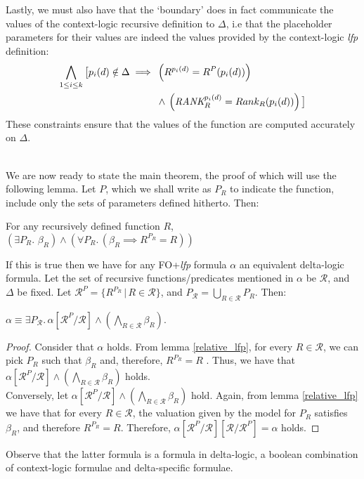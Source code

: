 Lastly, we must also have that the `boundary' does in fact communicate the values of the context-logic recursive definition to $\Delta{}$, i.e that the placeholder parameters for their values are indeed the values provided by the context-logic \textit{lfp} definition:\\ 
\begin{align*}
\bigwedge\limits_{1 \leq{} i \leq{} k} \big\lbrack{} p_i(d) \notin{} \Delta{} \implies{} & \left( R^{p_i(d)} =  R^{P}(p_i(d)) \right) \notag{}\\
& \land{} \left( \textit{RANK}_{R}^{p_i(d)} =  Rank_{R}(p_i(d)) \right) \big\rbrack{} \notag{} 
\end{align*}
These constraints ensure that the values of the function are computed accurately on $\Delta{}$.\\\

We are now ready to state the main theorem, the proof of which will use the following lemma. Let $P$, which we shall write as $P_{R}$ to indicate the function, include only the sets of parameters defined hitherto. Then: 

\begin{lemma}
\label{relative_lfp}
For any recursively defined function $R$, $\left(\exists{}P_{R}.\,\,\beta_{R} \right) \land{} \left(\forall{}P_{R}.\,\left(\beta_{R} \implies{} R^{P_{R}} = R\right) \right)$
\end{lemma}

If this is true then we have for any FO+\textit{lfp} formula $\alpha$ an equivalent delta-logic formula. Let the set of recursive functions/predicates mentioned in $\alpha{}$ be $\mathcal{R}$, and $\Delta{}$ be fixed. Let $\mathcal{R}^{P} = \{ R^{P_{R}} \,|\, R \in{} \mathcal{R}\}$, and $P_{\mathcal{R}} = \bigcup\limits_{R \in{} \mathcal{R}}P_{R}$. Then:\\

\begin{theorem}[Separability]
\label{Separability}
$\alpha{} \equiv{} \exists{}P_{\mathcal{R}}.\, \alpha[\mathcal{R}^{P}/\mathcal{R}] \land{} \left( \bigwedge\limits_{R \in{} \mathcal{R}} \beta_{R} \right)$.
\end{theorem}

\begin{proof}
Consider that $\alpha{}$ holds. From lemma \ref{relative_lfp}, for every $R \in{} \mathcal{R}$, we can pick $P_{R}$ such that $\beta_{R}$ and, therefore, $R^{P_{R}} = R$ . Thus, we have that $\alpha[\mathcal{R}^{P}/\mathcal{R}] \land{} \left( \bigwedge\limits_{R \in{} \mathcal{R}} \beta_{R}\right)$ holds.\\
Conversely, let $\alpha[\mathcal{R}^{P}/\mathcal{R}] \land{} \left( \bigwedge\limits_{R \in{} \mathcal{R}} \beta_{R} \right)$ hold. Again, from lemma \ref{relative_lfp} we have that for every $R \in{} \mathcal{R}$, the valuation given by the model for $P_{R}$ satisfies $\beta_{R}$, and therefore $R^{P_{R}} = R$. Therefore, $\alpha[\mathcal{R}^{P}/\mathcal{R}][\mathcal{R}/\mathcal{R}^{P}] = \alpha{}$ holds.
\end{proof}
Observe that the latter formula is a formula in delta-logic, a boolean combination of context-logic formulae and delta-specific formulae.